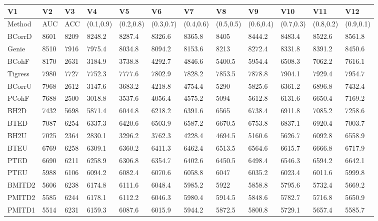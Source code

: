 \begin{table}[ht]
\centering
\begin{tabular}{llllllllllll}
  \hline
V1 & V2 & V3 & V4 & V5 & V6 & V7 & V8 & V9 & V10 & V11 & V12 \\ 
  \hline
Method & AUC & ACC & (0.1,0.9) & (0.2,0.8) & (0.3,0.7) & (0.4,0.6) & (0.5,0.5) & (0.6,0.4) & (0.7,0.3) & (0.8,0.2) & (0.9,0.1) \\ 
  BCorrD & 8601 & 8209 & 8248.2 & 8287.4 & 8326.6 & 8365.8 & 8405 & 8444.2 & 8483.4 & 8522.6 & 8561.8 \\ 
  Genie & 8510 & 7916 & 7975.4 & 8034.8 & 8094.2 & 8153.6 & 8213 & 8272.4 & 8331.8 & 8391.2 & 8450.6 \\ 
  BCohF & 8170 & 2631 & 3184.9 & 3738.8 & 4292.7 & 4846.6 & 5400.5 & 5954.4 & 6508.3 & 7062.2 & 7616.1 \\ 
  Tigress & 7980 & 7727 & 7752.3 & 7777.6 & 7802.9 & 7828.2 & 7853.5 & 7878.8 & 7904.1 & 7929.4 & 7954.7 \\ 
  BCorrU & 7968 & 2612 & 3147.6 & 3683.2 & 4218.8 & 4754.4 & 5290 & 5825.6 & 6361.2 & 6896.8 & 7432.4 \\ 
  PCohF & 7688 & 2500 & 3018.8 & 3537.6 & 4056.4 & 4575.2 & 5094 & 5612.8 & 6131.6 & 6650.4 & 7169.2 \\ 
  BH2D & 7432 & 5698 & 5871.4 & 6044.8 & 6218.2 & 6391.6 & 6565 & 6738.4 & 6911.8 & 7085.2 & 7258.6 \\ 
  BTED & 7087 & 6254 & 6337.3 & 6420.6 & 6503.9 & 6587.2 & 6670.5 & 6753.8 & 6837.1 & 6920.4 & 7003.7 \\ 
  BH2U & 7025 & 2364 & 2830.1 & 3296.2 & 3762.3 & 4228.4 & 4694.5 & 5160.6 & 5626.7 & 6092.8 & 6558.9 \\ 
  BTEU & 6769 & 6258 & 6309.1 & 6360.2 & 6411.3 & 6462.4 & 6513.5 & 6564.6 & 6615.7 & 6666.8 & 6717.9 \\ 
  PTED & 6690 & 6211 & 6258.9 & 6306.8 & 6354.7 & 6402.6 & 6450.5 & 6498.4 & 6546.3 & 6594.2 & 6642.1 \\ 
  PTEU & 5988 & 6106 & 6094.2 & 6082.4 & 6070.6 & 6058.8 & 6047 & 6035.2 & 6023.4 & 6011.6 & 5999.8 \\ 
  BMITD2 & 5606 & 6238 & 6174.8 & 6111.6 & 6048.4 & 5985.2 & 5922 & 5858.8 & 5795.6 & 5732.4 & 5669.2 \\ 
  PMITD2 & 5585 & 6244 & 6178.1 & 6112.2 & 6046.3 & 5980.4 & 5914.5 & 5848.6 & 5782.7 & 5716.8 & 5650.9 \\ 
  PMITD1 & 5514 & 6231 & 6159.3 & 6087.6 & 6015.9 & 5944.2 & 5872.5 & 5800.8 & 5729.1 & 5657.4 & 5585.7 \\ 

\end{tabular}
\end{table}

